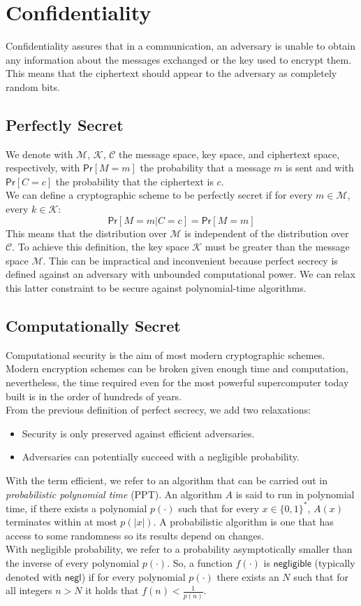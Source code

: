 \section{Confidentiality}
Confidentiality assures that in a communication, an adversary is unable to obtain any information about the messages exchanged or the key used to encrypt them. This means that the ciphertext should appear to the adversary as completely random bits.
\subsection{Perfectly Secret}
We denote with $\mathcal{M}$, $\mathcal{K}$, $\mathcal{C}$ the message space, key space, and ciphertext space, respectively,  with $\mathsf{Pr}[M = m]$ the probability that a message $m$ is sent and with $\mathsf{Pr}[C = c]$ the probability that the ciphertext is $c$.\\
We can define a cryptographic scheme to be perfectly secret if for every $m \in \mathcal{M}$, every $k \in \mathcal{K}$:
$$
    \mathsf{Pr}[M = m | C = c] = \mathsf{Pr}[M = m]
$$
This means that the distribution over $\mathcal{M}$ is independent of the distribution over $\mathcal{C}$.
To achieve this definition, the key space $\mathcal{K}$ must be greater than the message space $\mathcal{M}$. This can be impractical and inconvenient because perfect secrecy is defined against an adversary with unbounded computational power. We can relax this latter constraint to be secure against polynomial-time algorithms.

\subsection{Computationally Secret}
Computational security is the aim of most modern cryptographic schemes. Modern encryption schemes can be broken given enough time and computation, nevertheless, the time required even for the most powerful supercomputer today built is in the order of hundreds of years.\\
From the previous definition of perfect secrecy, we add two relaxations:
\begin{itemize}
    \item{Security is only preserved against efficient adversaries.}
    \item{Adversaries can potentially succeed with a negligible probability.}
\end{itemize}
With the term efficient, we refer to an algorithm that can be carried out in \emph{probabilistic polynomial time} (PPT). An algorithm $\mathit{A}$ is said to run in polynomial time, if there exists a polynomial $p(\cdot)$ such that for every $x \in \{0, 1\}^*$, $\mathit{A}(x)$ terminates within at most $p(|x|)$. A probabilistic algorithm is one that has access to some randomness so its results depend on changes.\\
With negligible probability, we refer to a probability asymptotically smaller than the inverse of every polynomial $p(\cdot)$.
So, a function $f(\cdot)$ is $\mathsf{negligible}$ (typically denoted with $\mathsf{negl}$) if for every polynomial $p(\cdot)$ there exists an $N$ such that for all integers $n > N$ it holds that $f(n) < \frac{1}{p(n)}$.

